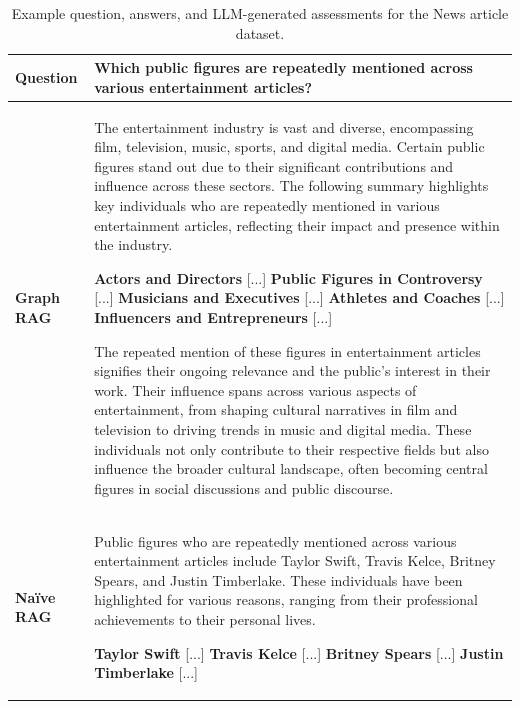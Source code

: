 \begin{table}[h]
    \caption{Example question, answers, and LLM-generated assessments for the News article dataset.}
    \small
    \centering
    \def\arraystretch{1.25}%
    \begin{tabular}{>{\raggedright\arraybackslash}p{}>{\raggedright\arraybackslash}p{}} \hline 
 \textbf{Question} & \textbf{Which public figures are repeatedly mentioned across various entertainment articles?}\\ \hline 
 \textbf{Graph RAG} & The entertainment industry is vast and diverse, encompassing film, television, music, sports, and digital media. Certain public figures stand out due to their significant contributions and influence across these sectors. The following summary highlights key individuals who are repeatedly mentioned in various entertainment articles, reflecting their impact and presence within the industry.


\textbf{Actors and Directors} [...] \textbf{Public Figures in Controversy} [...]
 \textbf{Musicians and Executives} [...] \textbf{Athletes and Coaches} [...] \textbf{Influencers and Entrepreneurs} [...]

 
The repeated mention of these figures in entertainment articles signifies their ongoing relevance and the public's interest in their work. Their influence spans across various aspects of entertainment, from shaping cultural narratives in film and television to driving trends in music and digital media. These individuals not only contribute to their respective fields but also influence the broader cultural landscape, often becoming central figures in social discussions and public discourse.\vspace*{2mm}\\ \hline 
\textbf{Na\"ive RAG} & Public figures who are repeatedly mentioned across various entertainment articles include Taylor Swift, Travis Kelce, Britney Spears, and Justin Timberlake. These individuals have been highlighted for various reasons, ranging from their professional achievements to their personal lives.

\textbf{Taylor Swift} [...] \textbf{Travis Kelce} [...] \textbf{Britney Spears} [...] \textbf{Justin Timberlake}
[...]


\end{tabular}
\end{table}
